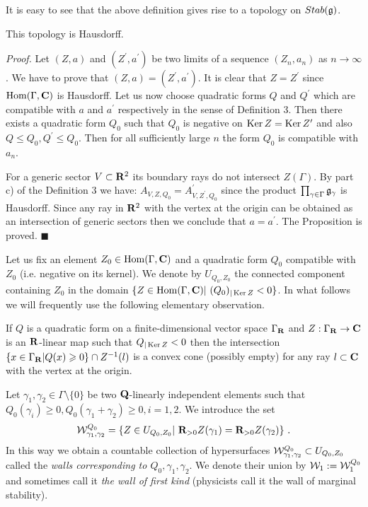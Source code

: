 \documentclass[12pt]{article}
\begin{document}
It is easy to see that the above definition gives rise to a topology on $Stab({\mathfrak g})$.
\begin{prp} This topology is Hausdorff.



\end{prp}
{\it Proof.} Let $(Z,a)$ and $(Z^{\prime},a^{\prime})$ be two limits of a sequence $(Z_n,a_n)$ as $n\to \infty$. We have to prove that $(Z,a)=(Z^{\prime},a^{\prime})$.
It is clear that $Z=Z^{\prime}$ since $\operatorname{Hom}(\Gamma,{\bf C})$ is Hausdorff. Let us now choose quadratic forms
$Q$ and $Q^{\prime}$ which are compatible with $a$ and $a^{\prime}$ respectively in the sense of Definition 3. Then there exists a quadratic form ${Q}_0$ such that ${Q}_0$ is negative on $\operatorname{Ker}Z=\operatorname{Ker}Z^{\prime}$ and also $Q\le {Q}_0, Q^{\prime}\le {Q}_0$. Then for all sufficiently large $n$ the form ${Q}_0$ is compatible with $a_n$.

For a generic sector $V\subset {\bf R}^2$ its boundary rays do not intersect $Z(\Gamma)$. By part c) of the Definition 3 we have: $A_{V,Z, {Q}_0}=A_{V,Z^{\prime}, {Q}_0}^{\prime}$ since the product
$\prod_{\gamma \in \Gamma}{\mathfrak g}_{\gamma}$ is Hausdorff. Since any ray in ${\bf R}^2$ with the vertex at the origin can be obtained as an intersection of  generic sectors then we conclude that $a=a^{\prime}$. The Proposition is proved. $\blacksquare$

Let us fix an element $Z_0\in \operatorname{Hom}(\Gamma,{\bf C})$ and a quadratic form $Q_0$ compatible with $Z_0$ (i.e. negative on its kernel).
We denote by $U_{Q_0,Z_0}$ the connected component containing $Z_0$ in the domain $\{Z\in \operatorname{Hom}(\Gamma,{\bf C})|\,\, (Q_0)_{|\operatorname{Ker} Z}<0\}$.
In what follows we will frequently use the following elementary observation.

\begin{prp} If $Q$ is a quadratic form on a finite-dimensional vector space $\Gamma_{{\bf R}}$ and $Z:\Gamma_{{\bf R}}\to {\bf C}$ is an ${\bf R}$-linear map such that $Q_{|\operatorname{Ker}Z}<0$ then the intersection
$\{x\in \Gamma_{{\bf R}}|Q(x)\geqslant 0\}\cap Z^{-1}(l)$ is a convex cone (possibly empty) for any ray $l\subset {\bf C}$ with the vertex at the origin.


\end{prp}

Let $\gamma_1,\gamma_2\in \Gamma\setminus \{0\}$ be two ${\bf Q}$-linearly independent elements such that
$Q_0(\gamma_i)\geqslant 0, Q_0(\gamma_1+\gamma_2)\geqslant 0, i=1,2$.
We introduce the set
$${\cal W}^{Q_0}_{\gamma_1,\gamma_2}=\{Z\in U_{Q_0,Z_0}|\,\,{\bf R}_{>0}Z(\gamma_1)={\bf R}_{>0}Z(\gamma_2)\}\,\,.$$
In this way we obtain a countable collection of hypersurfaces
${\cal W}^{Q_0}_{\gamma_1,\gamma_2}\subset U_{Q_0,Z_0}$ called the {\it walls corresponding to $Q_0,\gamma_1,\gamma_2$}. We denote their union by ${\cal W}_1:={\cal W}_1^{Q_0}$ and sometimes call it
{\it the wall of first kind} (physicists call it the wall of marginal stability).
\end{document}
